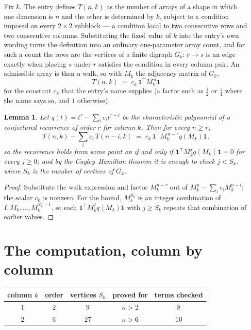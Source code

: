 \documentclass[11pt,a4paper]{article}
\theoremstyle{plain}
\newtheorem{lemma}[theorem]{Lemma}
\theoremstyle{definition}
\begin{document}
Fix $k$. The entry defines $T(n,k)$ as the number of arrays of a shape in which one dimension
is $n$ and the other is determined by $k$, subject to a condition imposed on every
$2\times2$ subblock --- a condition local to two consecutive rows and two consecutive columns.
Substituting the fixed value of $k$ into the entry's own wording turns the definition into an
ordinary one-parameter array count, and for such a count the rows are the vertices of a finite
digraph $G_k$: $r\to s$ is an edge exactly when placing $s$ under $r$ satisfies the condition
in every column pair. An admissible array is then a walk, so with $M_k$ the adjacency matrix
of $G_k$,
\[
T(n,k)\;=\;c_k\,\mathbf{1}^{\!\top}M_k^{\,n}\mathbf{1}
\]
for the constant $c_k$ that the entry's name supplies (a factor such as $\tfrac12$ or
$\tfrac14$ where the name says so, and $1$ otherwise).

\begin{lemma}\label{lem:crit}
Let $q(t)=t^{r}-\sum_i c_it^{r-i}$ be the characteristic polynomial of a conjectured
recurrence of order $r$ for column $k$. Then for every $n\ge r$,
\[
T(n,k)-\sum_i c_i\,T(n-i,k)\;=\;c_k\,\mathbf{1}^{\!\top}M_k^{\,n-r}q(M_k)\mathbf{1},
\]
so the recurrence holds from some point on if and only if
$\mathbf{1}^{\!\top}M_k^{j}q(M_k)\mathbf{1}=0$ for every $j\ge0$; and by the
Cayley--Hamilton theorem it is enough to check $j<S_k$, where $S_k$ is the number of vertices
of $G_k$.
\end{lemma}

\begin{proof}
Substitute the walk expression and factor $M_k^{n-r}$ out of $M_k^{n}-\sum_ic_iM_k^{n-i}$;
the scalar $c_k$ is nonzero. For the bound, $M_k^{S_k}$ is an integer combination of
$I,M_k,\dots,M_k^{S_k-1}$, so each $\mathbf{1}^{\!\top}M_k^{j}q(M_k)\mathbf{1}$ with
$j\ge S_k$ repeats that combination of earlier values.
\end{proof}

\section{The computation, column by column}

\begin{center}
\begin{tabular}{ccccc}
column $k$ & order & vertices $S_k$ & proved for & terms checked \\ \hline
$1$ & $2$ & $9$ & $n>2$ & $8$ \\
$2$ & $6$ & $27$ & $n>6$ & $10$ \\
\end{tabular}
\end{center}
\end{document}
